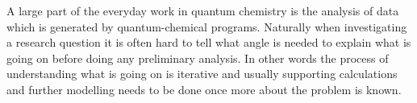 


%
%
%
%

A large part of the everyday work in quantum chemistry
is the analysis of data which is generated by quantum-chemical programs.
Naturally when investigating a research question it is often
hard to tell what angle is needed to explain what is going on
before doing any preliminary analysis.
In other words the process of understanding what is going on is iterative
and usually supporting calculations and further modelling
needs to be done once more about the problem is known.

